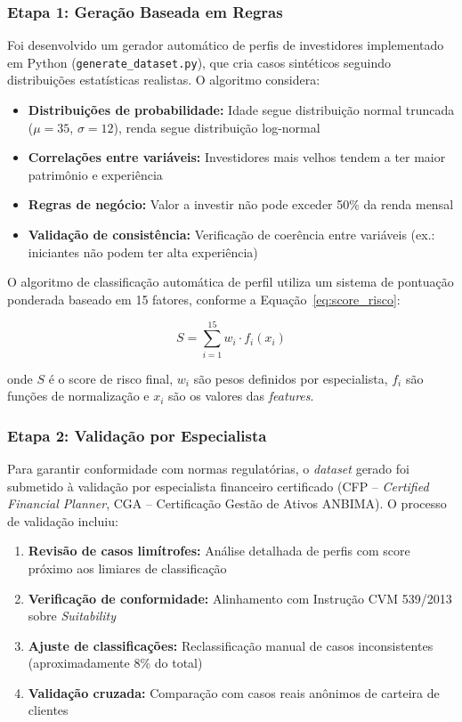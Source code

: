 \subsubsection{Etapa 1: Geração Baseada em Regras}

Foi desenvolvido um gerador automático de perfis de investidores implementado em Python (\texttt{generate\_dataset.py}), que cria casos sintéticos seguindo distribuições estatísticas realistas. O algoritmo considera:

\begin{itemize}
    \item \textbf{Distribuições de probabilidade:} Idade segue distribuição normal truncada ($\mu=35$, $\sigma=12$), renda segue distribuição log-normal
    \item \textbf{Correlações entre variáveis:} Investidores mais velhos tendem a ter maior patrimônio e experiência
    \item \textbf{Regras de negócio:} Valor a investir não pode exceder 50\% da renda mensal
    \item \textbf{Validação de consistência:} Verificação de coerência entre variáveis (ex.: iniciantes não podem ter alta experiência)
\end{itemize}

O algoritmo de classificação automática de perfil utiliza um sistema de pontuação ponderada baseado em 15 fatores, conforme a Equação~\ref{eq:score_risco}:

\begin{equation}
\label{eq:score_risco}
S = \sum_{i=1}^{15} w_i \cdot f_i(x_i)
\end{equation}

onde $S$ é o score de risco final, $w_i$ são pesos definidos por especialista, $f_i$ são funções de normalização e $x_i$ são os valores das \textit{features}.

\subsubsection{Etapa 2: Validação por Especialista}

Para garantir conformidade com normas regulatórias, o \textit{dataset} gerado foi submetido à validação por especialista financeiro certificado (CFP\textregistered{} -- \textit{Certified Financial Planner}, CGA -- Certificação Gestão de Ativos ANBIMA). O processo de validação incluiu:

\begin{enumerate}
    \item \textbf{Revisão de casos limítrofes:} Análise detalhada de perfis com score próximo aos limiares de classificação
    \item \textbf{Verificação de conformidade:} Alinhamento com Instrução CVM 539/2013 sobre \textit{Suitability}
    \item \textbf{Ajuste de classificações:} Reclassificação manual de casos inconsistentes (aproximadamente 8\% do total)
    \item \textbf{Validação cruzada:} Comparação com casos reais anônimos de carteira de clientes
\end{enumerate}

